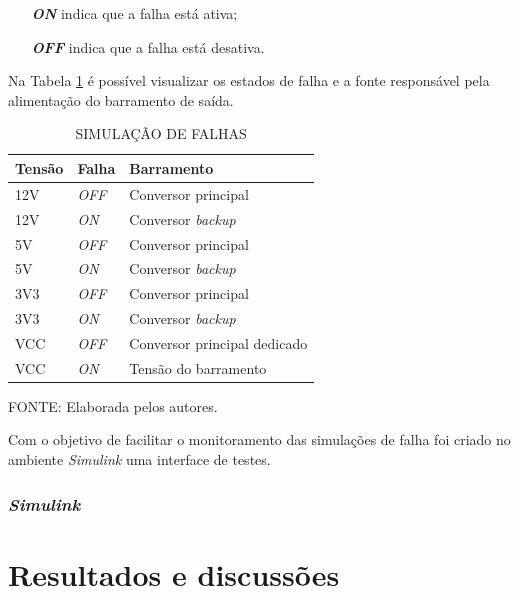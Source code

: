 \documentclass[
	12pt,				%
	openright,			%
	oneside,			%
	a4paper,			%
	english,			%
	french,				%
	spanish,			%
	brazil,				%
	oldfontcommands
	]{abntex2}
\begin{document}
	\begin{itemize}
		\item[\textbf{\textit{ON}}] indica que a falha está ativa;
		\item[\textbf{\textit{OFF}}] indica que a falha está desativa. 
	\end{itemize}
	
	Na Tabela \ref{Tab_Simulador} é possível visualizar os estados de falha e a fonte responsável pela alimentação do barramento de saída.
	
	\begin{table}[th]
	\caption{SIMULAÇÃO DE FALHAS}
	\label{Tab_Simulador}
	\centering
		\begin{tabular}{p{1.5cm}|p{1.5cm}|p{5.5cm}}
			\textbf{Tensão} & \textbf{Falha} & \textbf{Barramento}\\
			\hline
			12V & \textit{OFF} & Conversor principal \\
			12V & \textit{ON} & Conversor \textit{backup} \\
			5V & \textit{OFF} & Conversor principal \\
			5V & \textit{ON} & Conversor \textit{backup} \\
			3V3 & \textit{OFF} & Conversor principal \\
			3V3 & \textit{ON} & Conversor \textit{backup} \\
			VCC & \textit{OFF} & Conversor principal dedicado \\
			VCC & \textit{ON} & Tensão do barramento \\
		\end{tabular}	
	
	\begin{small}
	\vspace{3pt}
		FONTE: Elaborada pelos autores.
	\end{small}
	\end{table}
	\pagebreak
	
	Com o objetivo de facilitar o monitoramento das simulações de falha foi criado no ambiente \textit{Simulink} uma interface de testes.
	
\subsection[Simulink]{\textit{Simulink}}


\chapter[Resultados e discussões]{Resultados e discussões}
\end{document}
